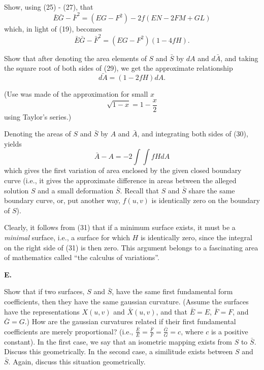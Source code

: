 \documentclass{book}
\begin{document}
Show, using (25) - (27), that
\begin{equation}
\bar{E} \bar{G} - \bar{F}^{2} = (EG - F^{2}) - 2f(EN - 2FM + GL)
\end{equation}
which, in light of (19), becomes
\begin{equation}
\bar{E} \bar{G} - \bar{F}^{2} = (EG - F^{2})(1 - 4fH).
\end{equation}

Show that after denoting the area elements of $S$ and $\bar{S}$ by $dA$ and $d \bar{A}$, and taking the square root of both sides of (29), we get the approximate relationship
\begin{equation}
\bar{dA} = (1 - 2fH)dA.
\end{equation}

(Use was made of the approximation for small $x$
\begin{equation*}
\sqrt{1 -x} = 1 - \frac{x}{2}
\end{equation*}
using Taylor's series.) 

Denoting the areas of $S$ and $\bar{S}$ by $A$ and $\bar{A}$, and integrating both sides of (30), yields
\begin{equation}
\bar{A} - A = - 2 \int \int fHdA
\end{equation}
which gives the first variation of area enclosed by the given closed boundary curve (i.e., it gives the approximate difference in areas between the alleged solution $S$ and a small deformation $\bar{S}$. Recall that $S$ and $\bar{S}$ share the same boundary curve, or, put another way, $f(u,v)$ is identically zero on the boundary of $S$).

Clearly, it follows from (31) that if a minimum surface exists, it must be a \emph{minimal} surface, i.e., a surface for which $H$ is identically zero, since the integral on the right side of (31) is then zero. This argument belongs to a fascinating area of mathematics called ``the calculus of variations''.

\vspace{0.3cm}

\noindent \textbf{E.}

\vspace{0.3cm}

Show that if two surfaces, $S$ and $\bar{S}$, have the same first fundamental form coefficients, then they have the same gaussian curvature. (Assume the surfaces have the representations $X(u,v)$ and $\bar{X}(u,v)$, and that $\bar{E} = E$, $\bar{F} = F$, and $\bar{G} = G$.) How are the gaussian curvatures related if their first fundamental coefficients are merely proportional? (i.e., $\frac{\bar{E}}{E} = \frac{\bar{F}}{F} = \frac{\bar{G}}{G} = c$, where $c$ is a positive constant). In the first case, we say that an isometric mapping exists from $S$ to $\bar{S}$. Discuss this geometrically. In the second case, a similitude exists between $S$ and $\bar{S}$. Again, discuss this situation geometrically.
\end{document}
